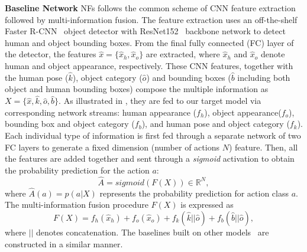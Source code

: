 \noindent\textbf{Baseline Network}
NFs follows the common scheme of CNN feature extraction followed by multi-information fusion. The feature extraction uses an off-the-shelf Faster R-CNN~\cite{ren2015faster} object detector with ResNet152~\cite{he2016deep} backbone network to detect human and object bounding boxes. From the final fully connected (FC) layer of the detector, the features $\hat{x}=\{\hat{x}_h,\hat{x}_o\}$ are extracted, where $\hat{x}_h$ and $\hat{x}_o$ denote human and object appearance, respectively. These CNN features, together with the human pose ($\hat{k}$), object category ($\hat{o}$) and bounding boxes ($\hat{b}$ including both object and human bounding boxes) compose the multiple information as $X=\{\hat{x},\hat{k},\hat{o},\hat{b}\}$. As illustrated in , they are fed to our target model via corresponding network streams: human appearance ($f_h$), object appearance($f_o$), bounding box and object category ($f_b$), and human pose and object category ($f_k$). Each individual type of information is first fed through a separate network of two FC layers to generate a fixed dimension (number of actions $N$) feature. Then, all the features are added together and sent through a \emph{sigmoid} activation to obtain the probability prediction for the action $a$:
\begin{equation}
    \hat{A}= sigmoid(F(X)) \in \mathbb{R}^N,
\label{eq:base_action_pred}
\end{equation}
where $\hat{A}(a) = p(a|X)$ represents the probability prediction for action class $a$.
The multi-information fusion procedure $F(X)$ is expressed as 
 \begin{equation}
     F(X) = f_h(\hat{x}_h) + f_o(\hat{x}_o) + f_k(\hat{k}||\hat{o})+ f_b(\hat{b}||\hat{o}),
 \label{eq:base_action_pred_simple}
 \end{equation}
 where 
$||$ denotes concatenation. The baselines built on other models~\cite{gao2020drg,liao2020ppdm} are constructed in a similar manner.


